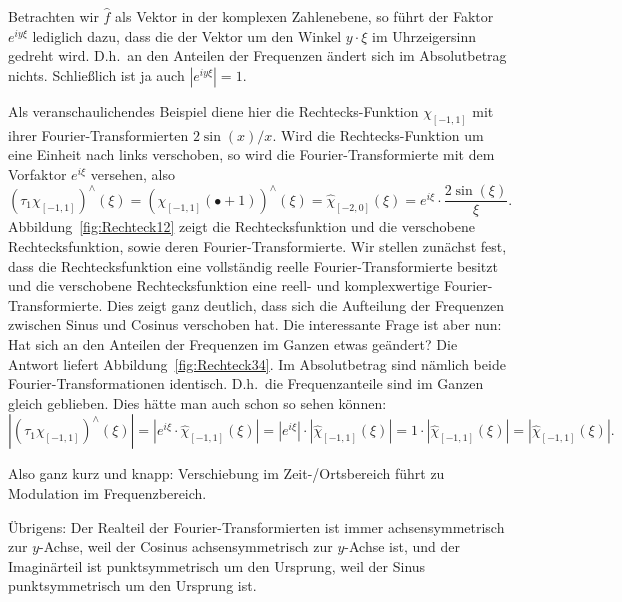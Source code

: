 \begin{remark}
\begin{description}
		Betrachten wir $ \widehat{f} $ als Vektor in der komplexen Zahlenebene, so führt der Faktor $ 
		e^{iy\xi} $ lediglich dazu, dass die 
		der Vektor um den Winkel $ y \cdot \xi $ im Uhrzeigersinn gedreht wird. D.h.\ an den Anteilen
		der Frequenzen ändert sich im Absolutbetrag nichts. Schließlich ist ja auch $ |e^{iy\xi}| = 1 $.
		
		Als veranschaulichendes Beispiel diene hier die Rechtecks-Funktion $ \chi_{[-1,1]} $ mit
		ihrer Fourier-Transformierten $ 2\sin(x) / x $. Wird die Rechtecks-Funktion um eine Einheit 
		nach 
		links verschoben, so wird die Fourier-Transformierte mit dem Vorfaktor $ e^{i\xi} $ versehen,
		also
		\[   (\tau_{1}\chi_{[-1,1]})^{\wedge}(\xi)
  		 = \left( \chi_{[-1,1]}(\bullet + 1) \right)^{\wedge}(\xi)
  		 = \widehat{\chi}_{[-2,0]}(\xi)
  		 = e^{i\xi} \cdot \frac{2 \sin(\xi)}{\xi}.
  	\]
  	Abbildung~\ref{fig:Rechteck12} zeigt die Rechtecksfunktion und die verschobene 
  	Rechtecksfunktion, sowie deren Fourier-Transformierte. Wir stellen zunächst fest, dass die
  	Rechtecksfunktion eine vollständig reelle Fourier-Transformierte besitzt und die verschobene
  	Rechtecksfunktion eine reell- und komplexwertige Fourier-Transformierte. Dies zeigt ganz 
  	deutlich, dass sich die Aufteilung der Frequenzen zwischen Sinus und Cosinus verschoben hat. Die
  	interessante Frage ist aber nun: Hat sich an den Anteilen der Frequenzen im Ganzen etwas 
  	geändert? Die Antwort liefert Abbildung~\ref{fig:Rechteck34}. Im Absolutbetrag sind nämlich 
  	beide Fourier-Transformationen identisch. D.h.\ die Frequenzanteile sind im Ganzen gleich
  	geblieben. Dies hätte man auch schon so sehen können:
  	\[
    	  \left| (\tau_{1}\chi_{[-1,1]})^{\wedge}(\xi) \right|
    	= \left| e^{i\xi} \cdot \widehat{\chi}_{[-1,1]}(\xi) \right|
    	= \left| e^{i\xi} \right| \cdot \left| \widehat{\chi}_{[-1,1]}(\xi) \right|
    	= 1 \cdot \left| \widehat{\chi}_{[-1,1]}(\xi) \right|
    	= \left| \widehat{\chi}_{[-1,1]}(\xi) \right|.
  	\]
  	
  	Also ganz kurz und knapp: Verschiebung im Zeit-/Ortsbereich führt zu Modulation im
  	Frequenzbereich.
  	
  	Übrigens: Der Realteil der Fourier-Transformierten ist immer achsensymmetrisch zur $ y $-Achse,
  	weil der Cosinus achsensymmetrisch zur $ y $-Achse ist, und der Imaginärteil ist 
  	punktsymmetrisch um den Ursprung, weil der Sinus punktsymmetrisch um den Ursprung ist.
 

\end{description}
\end{remark}
